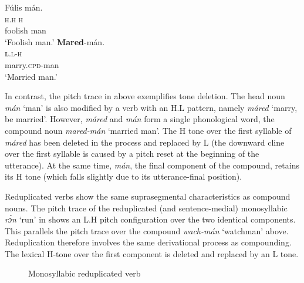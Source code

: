 \ea\label{ex:key:58}
\glll   Fúlis  mán.\\
\textsc{h.h}    \textsc{h}\\
foolish  man\\
\glt   ‘Foolish man.’ 
\z
\ea\label{ex:key:59}
\glll    \textbf{Mared}{}-mán.\\
\textbf{\textsc{l}}.\textsc{l-h}\\
marry.\textsc{cpd}{}-man\\
\glt ‘Married man.’
\z

In contrast, the pitch trace in  above exemplifies tone deletion. The head noun \textit{mán} ‘man’ is also modified by a verb with an H.L pattern, namely \textit{máred} ‘marry, be married’. However, \textit{máred} and \textit{mán} form a single phonological word, the compound noun \textit{mared-mán} ‘married man’. The H tone over the first syllable of \textit{máred} has been deleted in the process and replaced by L (the downward cline over the first syllable is caused by a pitch reset at the beginning of the utterance). At the same time, \textit{mán}, the final component of the compound, retains its H tone (which falls slightly due to its utterance-final position).

Reduplicated verbs show the same suprasegmental characteristics as compound nouns. The pitch trace of the reduplicated (and sentence-medial) monosyllabic \textit{rɔ́n} ‘run’ in  shows an L.H pitch configuration over the two identical components. This parallels the pitch trace over the compound \textit{wach-mán} ‘watchman’ above. Reduplication therefore involves the same derivational process as compounding. The lexical H-tone over the first component is deleted and replaced by an L tone.


\begin{figure}
\caption{Monosyllabic reduplicated verb}
\label{fig:key:3.21}
\end{figure}

